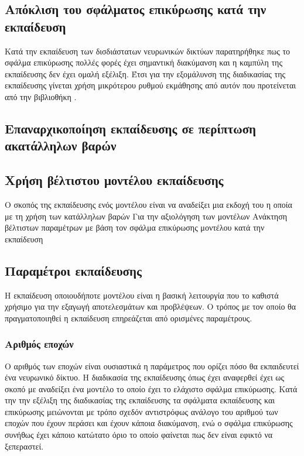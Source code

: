 \subsection{Απόκλιση του σφάλματος επικύρωσης  κατά την εκπαίδευση}
Κατά την εκπαίδευση των δισδιάστατων νευρωνικών δικτύων παρατηρήθηκε πως το σφάλμα επικύρωσης πολλές φορές έχει σημαντική διακύμανση και η καμπύλη της εκπαίδευσης δεν έχει ομαλή εξέλιξη. Έτσι για την εξομάλυνση της διαδικασίας της εκπαίδευσης γίνεται χρήση μικρότερου ρυθμού εκμάθησης  από αυτόν που προτείνεται από την βιβλιοθήκη .

\subsection{Επαναρχικοποίηση εκπαίδευσης σε περίπτωση ακατάλληλων βαρών}


\subsection{Χρήση βέλτιστου μοντέλου εκπαίδευσης}
Ο σκοπός της εκπαίδευσης ενός μοντέλου είναι να αναδείξει μια εκδοχή του η οποία με τη χρήση των κατάλληλων βαρών 
Για την αξιολόγηση των μοντέλων
Ανάκτηση βέλτιστων παραμέτρων με βάση τον σφάλμα επικύρωσης
 μοντέλου κατά την εκπαίδευση

\subsection{Παραμέτροι εκπαίδευσης}
Η εκπαίδευση οποιουδήποτε μοντέλου είναι η βασική λειτουργία που το καθιστά χρήσιμο για την εξαγωγή αποτελεσμάτων και προβλέψεων. Ο τρόπος με τον οποίο θα πραγματοποιηθεί η εκπαίδευση επηρεάζεται από ορισμένες παραμέτρους.
\subsubsection{Αριθμός εποχών}
Ο αριθμός των εποχών είναι ουσιαστικά η παράμετρος που ορίζει πόσο θα εκπαιδευτεί ένα νευρωνικό δίκτυο. Η διαδικασία της εκπαίδευσης όπως έχει αναφερθεί έχει ως σκοπό με αναδείξει ένα μοντέλο το οποίο έχει το ελάχιστο σφάλμα επικύρωσης. Κατά την την εξέλιξη της διαδικασίας της εκπαίδευσης τα σφάλματα εκπαίδευσης και επικύρωσης μειώνονται με τρόπο σχεδόν αντιστρόφως ανάλογο του αριθμού των εποχών που έχουν περάσει και έχουν κάποια διακύμανση, ενώ ο σφάλμα επικύρωσης συνήθως έχει κάποιο κατώτατο όριο το οποίο φαίνεται πως δεν είναι εφικτό να ξεπεραστεί.\\

